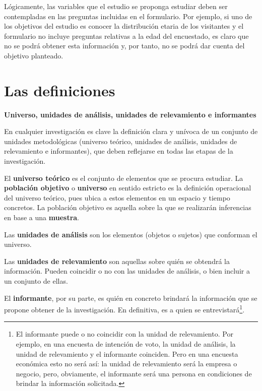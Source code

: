 \documentclass[
]{book}
\begin{document}
Lógicamente, las variables que el estudio se proponga estudiar deben ser contempladas en las preguntas incluidas en el formulario. Por ejemplo, si uno de los objetivos del estudio es conocer la distribución etaria de los visitantes y el formulario no incluye preguntas relativas a la edad del encuestado, es claro que no se podrá obtener esta información y, por tanto, no se podrá dar cuenta del objetivo planteado.

\hypertarget{las-definiciones}{%
\section{Las definiciones}\label{las-definiciones}}

\textbf{Universo, unidades de análisis, unidades de relevamiento e informantes}

En cualquier investigación es clave la definición clara y unívoca de un conjunto de unidades metodológicas (universo teórico, unidades de análisis, unidades de relevamiento e informantes), que deben reflejarse en todas las etapas de la investigación.

El \textbf{universo teórico} es el conjunto de elementos que se procura estudiar. La \textbf{población objetivo} o \textbf{universo} en sentido estricto es la definición operacional del universo teórico, pues ubica a estos elementos en un espacio y tiempo concretos. La población objetivo es aquella sobre la que se realizarán inferencias en base a una \textbf{muestra}.

Las \textbf{unidades de análisis} son los elementos (objetos o sujetos) que conforman el universo.

Las \textbf{unidades de relevamiento} son aquellas sobre quién se obtendrá la información. Pueden coincidir o no con las unidades de análisis, o bien incluir a un conjunto de ellas.

El \textbf{informante}, por su parte, es quién en concreto brindará la información que se propone obtener de la investigación. En definitiva, es a quien se entrevistará\footnote{El informante puede o no coincidir con la unidad de relevamiento. Por ejemplo, en una encuesta de intención de voto, la unidad de análisis, la unidad de relevamiento y el informante coinciden. Pero en una encuesta económica esto no será así: la unidad de relevamiento será la empresa o negocio, pero, obviamente, el informante será una persona en condiciones de brindar la información solicitada.}.\\
\end{document}
